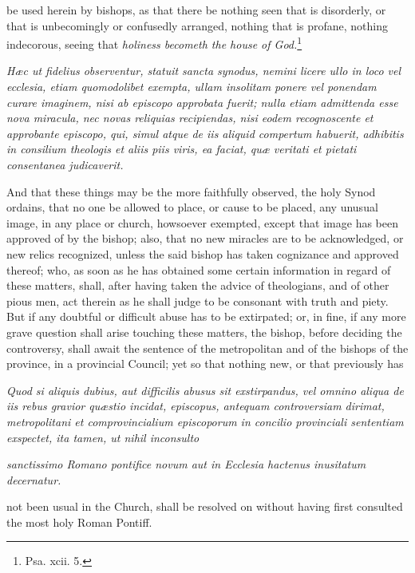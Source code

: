 be used herein by bishops, as that there be nothing seen that is disorderly, or that is unbecomingly or confusedly arranged, nothing that is profane, nothing indecorous, seeing that \emph{holiness becometh the house of God.}\footnote{\par   Psa. xcii. 5.}

\emph{Hæc ut fidelius observentur, statuit sancta synodus, nemini licere ullo in loco vel ecclesia, etiam quomodolibet exempta, ullam insolitam ponere vel ponendam curare imaginem, nisi ab episcopo approbata fuerit; nulla etiam admittenda esse nova miracula, nec novas reliquias recipiendas, nisi eodem recognoscente et approbante episcopo, qui, simul atque de iis aliquid compertum habuerit, adhibitis in consilium theologis et aliis piis viris, ea faciat, quæ veritati et pietati consentanea judicaverit.}

And that these things may be the more faithfully observed, the holy Synod ordains, that no one be allowed to place, or cause to be placed, any unusual image, in any place or church, howsoever exempted, except that image has been approved of by the bishop; also, that no new miracles are to be acknowledged, or new relics recognized, unless the said bishop has taken cognizance and approved thereof; who, as soon as he has obtained some certain information in regard of these matters, shall, after having taken the advice of theologians, and of other pious men, act therein as he shall judge to be consonant with truth and piety. But if any doubtful or difficult abuse has to be extirpated; or, in fine, if any more grave question shall arise touching these matters, the bishop, before deciding the controversy, shall await the sentence of the metropolitan and of the bishops of the province, in a provincial Council; yet so that nothing new, or that previously has

\emph{Quod si aliquis dubius, aut difficilis abusus sit exstirpandus, vel omnino aliqua de iis rebus gravior quæstio incidat, episcopus, antequam controversiam dirimat, metropolitani et comprovincialium episcoporum in concilio provinciali sententiam exspectet, ita tamen, ut nihil inconsulto }

\emph{sanctissimo Romano pontifice novum aut in Ecclesia hactenus inusitatum decernatur.}

not been usual in the Church, shall be resolved on without having first consulted the most holy Roman Pontiff.


